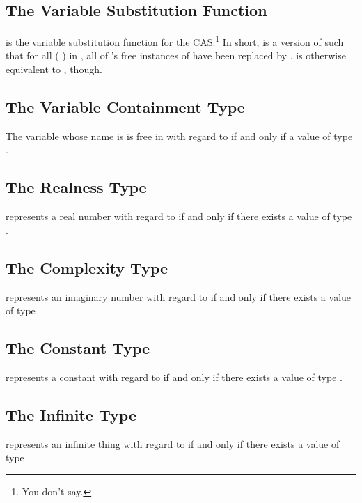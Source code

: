 \documentclass{report}
\begin{document}
\subsection{The Variable Substitution Function}
  is the variable substitution function for the  CAS.\footnote{You don't say.}
In short,     is a version of  such that for all \AgdaSymbol( \AgdaOperator{\AgdaInductiveConstructor{,}} \AgdaSymbol) in , all of 's free instances of   have been replaced by .      is otherwise equivalent to , though.

\subsection{The Variable Containment Type}
The variable whose name is  is free in  with regard to  if and only if a value of type    .

\subsection{The Realness Type}
 represents a real number with regard to  if and only if there exists a value of type   .

\subsection{The Complexity Type}
 represents an imaginary number with regard to  if and only if there exists a value of type   .

\subsection{The Constant Type}
 represents a constant with regard to  if and only if there exists a value of type   .

\subsection{The Infinite Type}
 represents an infinite thing with regard to  if and only if there exists a value of type   .
\end{document}
